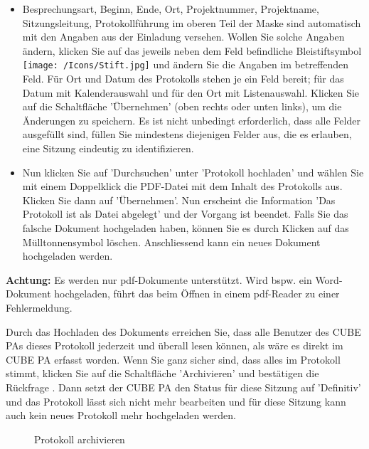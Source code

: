 \begin{itemize}
\item
Besprechungsart, Beginn, Ende, Ort, Projektnummer, Projektname, Sitzungsleitung, Protokollführung im oberen Teil der Maske sind automatisch mit den Angaben aus der Einladung versehen. Wollen Sie solche Angaben ändern, klicken Sie auf das jeweils neben dem Feld befindliche Bleistiftsymbol \texttt{[image: /Icons/Stift.jpg]}  und ändern Sie die Angaben im betreffenden Feld. Für Ort und Datum  des Protokolls stehen je ein Feld bereit; für das Datum mit Kalenderauswahl und für den Ort mit Listenauswahl. Klicken Sie auf die Schaltfläche 'Übernehmen'  (oben rechts oder unten links), um die Änderungen zu speichern. Es ist nicht unbedingt erforderlich, dass alle Felder ausgefüllt sind, füllen Sie mindestens diejenigen Felder aus, die es erlauben, eine Sitzung eindeutig zu identifizieren.
\item
Nun klicken Sie auf 'Durchsuchen'  unter 'Protokoll hochladen' und wählen Sie mit einem Doppelklick die PDF-Datei mit dem Inhalt des Protokolls aus. Klicken Sie dann auf 'Übernehmen'. Nun erscheint die Information 'Das Protokoll ist als Datei abgelegt'  und der Vorgang ist beendet. Falls Sie das falsche Dokument hochgeladen haben, können Sie es durch Klicken auf das Mülltonnensymbol löschen. Anschliessend kann ein neues Dokument hochgeladen werden.
\end{itemize}

\vspace{\baselineskip}

\textbf{Achtung:} Es werden nur pdf-Dokumente unterstützt. Wird bspw. ein Word-Dokument hochgeladen, führt das beim Öffnen in einem pdf-Reader zu einer Fehlermeldung.

\vspace{\baselineskip}

Durch das Hochladen des Dokuments erreichen Sie, dass alle Benutzer des CUBE PAs dieses Protokoll jederzeit und überall lesen können, als wäre es direkt im CUBE PA erfasst worden. Wenn Sie ganz sicher sind, dass alles im Protokoll stimmt, klicken Sie auf die Schaltfläche 'Archivieren'  und bestätigen die Rückfrage . Dann setzt der CUBE PA den Status für diese Sitzung auf 'Definitiv' und das Protokoll lässt sich nicht mehr bearbeiten und für diese Sitzung kann auch kein neues Protokoll mehr hochgeladen werden.

\begin{figure}[H]
\caption{Protokoll archivieren}
\end{figure}

